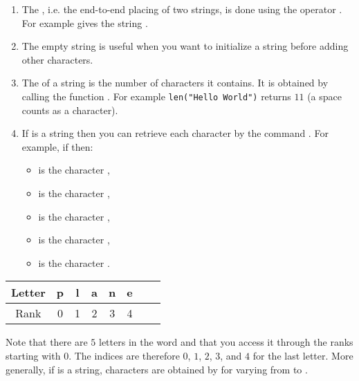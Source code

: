 \documentclass[11pt,class=report,crop=false]{standalone}
\begin{document}
\begin{cours}
\sauteligne
\begin{enumerate}
  \item The , i.e. the end-to-end placing of two strings, is done using the operator \ci{+}. For example  gives the string .
 
  \item The empty string  is useful when you want to initialize a string before adding other characters.
  
  \item The  of a string is the number of characters it contains. It is obtained by calling the function .
  For example \lstinline[showstringspaces=true]!len("Hello World")! returns $11$ (a space counts as a character).
  
  \item If  is a string then you can retrieve each character by the command . For example, if 
   then:
  \begin{itemize}
    \item {} is the character ,
    \item {} is the character , 
    \item {} is the character ,
    \item {} is the character ,       
    \item {} is the character .
  \end{itemize} 
\end{enumerate}  

\begin{center}
\begin{tabular}{|c||c|c|c|c|c|c|c|}
\hline
Letter & p & l & a & n & e \\ \hline
Rank   & 0 & 1 & 2 & 3 & 4 \\ \hline
\end{tabular}
\end{center}

  Note that there are $5$ letters in the word  and that you access it through the ranks starting with $0$. The indices are therefore $0$, $1$, $2$, $3$, and $4$ for the last letter.  More generally, if  is a string, characters are obtained by  for  varying from  to .
\end{cours}
\end{document}
